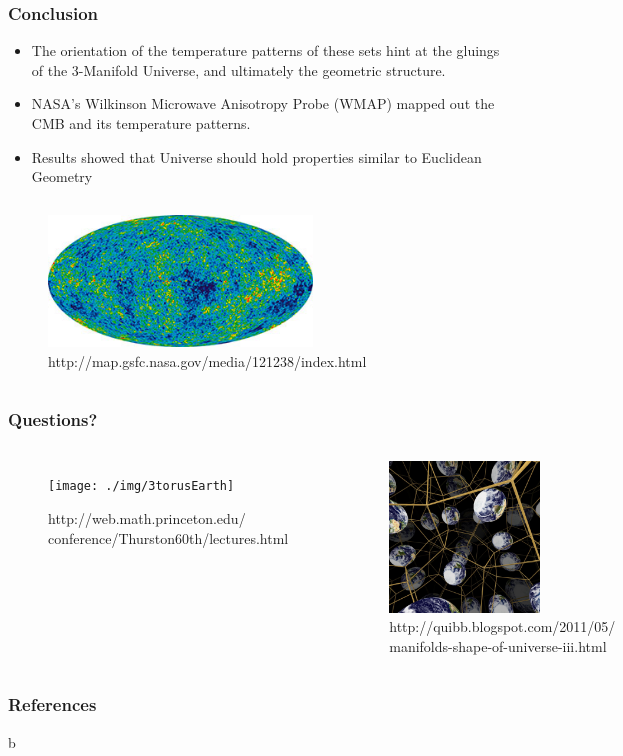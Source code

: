 \documentclass[13pt]{beamer}
\begin{document}
\begin{frame}
\frametitle{Conclusion}
  \begin{itemize}
    \item The orientation of the temperature patterns of these sets hint at the gluings of the 3-Manifold Universe, and ultimately the geometric structure.
    \item NASA's Wilkinson Microwave Anisotropy Probe (WMAP) mapped out the CMB and its temperature patterns.
    \item Results showed that Universe should hold properties similar to Euclidean Geometry
  \end{itemize}

  \begin{columns}[c] %
       \centering
        \begin{figure}
          \includegraphics[height=3.5cm]{./img/cmbsky} 
          \caption{http://map.gsfc.nasa.gov/media/121238/index.html}
        \end{figure}
    \end{columns}
\end{frame}

\begin{frame}
\frametitle{Questions?}
   \begin{columns}[c] %
     \centering
      \begin{figure}
        \texttt{[image: ./img/3torusEarth]} %
        \caption{http://web.math.princeton.edu/\\conference/Thurston60th/lectures.html}
      \end{figure}
     \centering
      \begin{figure}
        \includegraphics[height=4cm]{./img/poincarespaceEarth} %
        \caption{http://quibb.blogspot.com/2011/05/\\manifolds-shape-of-universe-iii.html}
      \end{figure}
  \end{columns}
\end{frame}

 \begin{frame}[allowframebreaks]
  \frametitle{References} 
  b
  
\end{frame}
\end{document}
